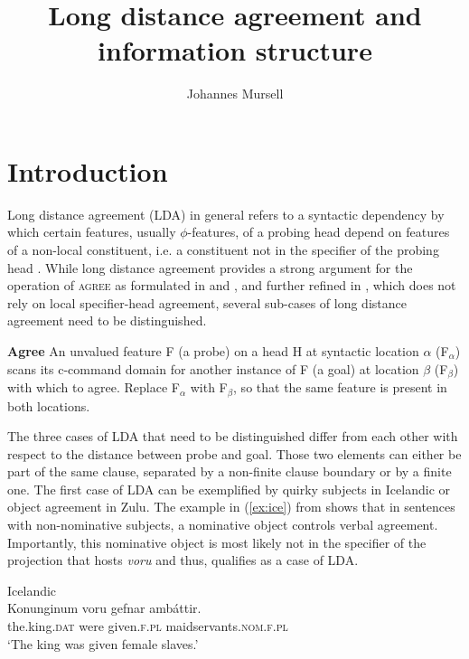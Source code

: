 \documentclass[output=paper
,modfonts
,nonflat]{langsci/langscibook}
\title{Long distance agreement and information structure}
\author{%
 Johannes Mursell\affiliation{Goethe University Frankfurt}
}
\begin{document}
\maketitle

\section{Introduction} 
Long distance agreement (LDA) in general refers to a syntactic dependency by which certain features, usually $ \phi $-features, of a probing head depend on features of a non-local constituent, i.e. a constituent not in the specifier of the probing head \citep{Bhatt_Keine2016}. While long distance agreement provides a strong argument for the operation of \textsc{agree} as formulated in \citet{Chomsky2000} and \citet{Chomsky2001}, and further refined in \citet{Pesetsky_Torrego2007}, which does not rely on local specifier-head agreement, several sub-cases of long distance agreement need to be distinguished.
\begin{exe} 
\ex \label{def:agr_pt} \textbf{Agree} \citep[][268]{Pesetsky_Torrego2007}
	\xlist
	\ex An unvalued feature F (a probe) on a head H at syntactic location $\alpha$ (F$_{\alpha}$) scans its c-command domain for another instance of F (a goal) at location $\beta$ (F$_{\beta}$) with which to agree. 
	\ex Replace F$_{\alpha}$ with F$_{\beta}$, so that the same feature is present in both locations.
	\endxlist
\end{exe}
The three cases of LDA that need to be distinguished differ from each other with respect to the distance between probe and goal. Those two elements can either be part of the same clause, separated by a non-finite clause boundary or by a finite one. The first case of LDA can be exemplified by quirky subjects in Icelandic or object agreement in Zulu. The example in (\ref{ex:ice}) from \citet{Zaenen_et_al1985} shows that in sentences with non-nominative subjects, a nominative object controls verbal agreement. Importantly, this nominative object is most likely not in the specifier of the projection that hosts \textit{voru} and thus, qualifies as a case of LDA.
\begin{exe} 
\ex Icelandic \citep[][460]{Zaenen_et_al1985}\label{ex:ice}\\ 
	\gll Konunginum voru gefnar amb\'{a}ttir.\\
	 the.king.\textsc{dat} were given.\textsc{f.pl} maidservants.\textsc{nom.f.pl}\\
	\glt `The king was given female slaves.'
\end{exe}
\end{document}
